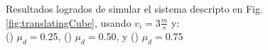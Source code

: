 \documentclass{article}
\begin{document}
\begin{figure}[H]%
  \centering
  \vspace*{6ex}
  \vspace*{6ex}
   \captionsetup{justification=centering}
  \caption{Resultados logrados de simular el sistema descripto en Fig. \ref{fig:translatingCube}, usando $v_i = 3 \frac{m}{s}$ y:\\ (\protect{}) $\mu_d=$0.25, (\protect{}) $\mu_d=$0.50, y (\protect{}) $\mu_d=$0.75}%
  \label{fig2} %
\end{figure}
\end{document}
